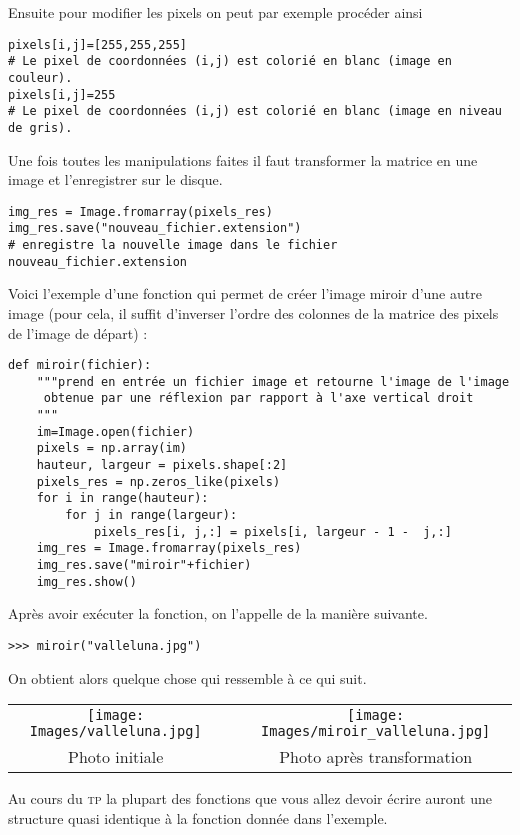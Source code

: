 \documentclass[10pt,a4paper,pdftex]{book}
\begin{document}
Ensuite pour modifier les pixels on peut par exemple procéder ainsi
\begin{lstlisting}
pixels[i,j]=[255,255,255]
# Le pixel de coordonnées (i,j) est colorié en blanc (image en couleur).
pixels[i,j]=255
# Le pixel de coordonnées (i,j) est colorié en blanc (image en niveau de gris).
\end{lstlisting}

Une fois toutes les manipulations faites il faut transformer la matrice en une image et l'enregistrer sur le disque. 
\begin{lstlisting}
img_res = Image.fromarray(pixels_res)
img_res.save("nouveau_fichier.extension")
# enregistre la nouvelle image dans le fichier nouveau_fichier.extension
\end{lstlisting}


\ex Voici l'exemple d'une fonction qui permet de créer l'image miroir d'une autre image (pour cela, il \og suffit\fg{} d'inverser l'ordre des colonnes de la matrice des pixels de l'image de départ) :
\begin{lstlisting}
def miroir(fichier):
    """prend en entrée un fichier image et retourne l'image de l'image
     obtenue par une réflexion par rapport à l'axe vertical droit
    """
    im=Image.open(fichier)
    pixels = np.array(im)
    hauteur, largeur = pixels.shape[:2]
    pixels_res = np.zeros_like(pixels)
    for i in range(hauteur):
        for j in range(largeur):
            pixels_res[i, j,:] = pixels[i, largeur - 1 -  j,:]
    img_res = Image.fromarray(pixels_res)
    img_res.save("miroir"+fichier)
    img_res.show()
\end{lstlisting}

Après avoir exécuter la fonction, on l'appelle de la manière suivante.
\begin{lstlisting}[style=compil]
>>> miroir("valleluna.jpg")
\end{lstlisting}

On obtient alors quelque chose qui ressemble à ce qui suit.
\begin{center}
\begin{tabular}{cp{2cm}c}
\texttt{[image: Images/valleluna.jpg]}
& &
\texttt{[image: Images/miroir\_valleluna.jpg]}
\\
Photo initiale & & Photo après transformation
\end{tabular}
\end{center}

Au cours du \textsc{tp} la plupart des fonctions que vous allez devoir écrire auront une structure quasi identique à la fonction donnée dans l'exemple.
\end{document}
